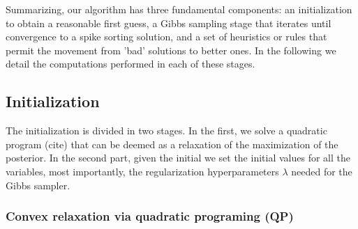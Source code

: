 \documentclass[12pt,letterpaper,fleqn]{article}
\begin{document}
Summarizing, our algorithm has three fundamental components: an initialization to obtain a reasonable first guess, a Gibbs sampling stage that iterates until convergence to a spike sorting solution, and a set of heuristics or rules that permit the movement from 'bad' solutions to better ones. In the following we detail the computations performed in each of these stages.

 \subsection{Initialization}
The initialization is divided in two stages. In the first, we solve a quadratic program (cite) that can be deemed as a relaxation of the maximization of the posterior.  In the second part, given the initial we set the initial values for all the variables, most importantly, the regularization hyperparameters $\lambda$ needed for the Gibbs sampler.
 \subsubsection{Convex relaxation via quadratic programing (QP)}
 
\end{document}
